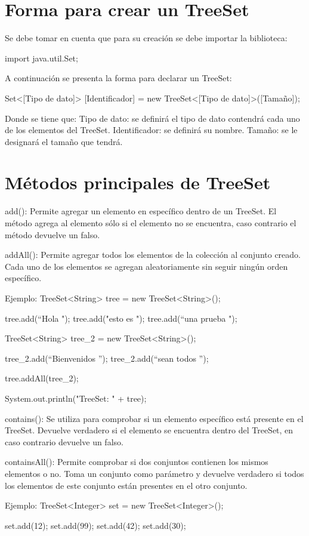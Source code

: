 \documentclass[12pt, letterpaper]{article} %
\begin{document}
\section*{Forma para crear un TreeSet}
Se debe tomar en cuenta que para su creación se debe importar la biblioteca:

import java.util.Set;

A continuación se presenta la forma para declarar un TreeSet:

Set<[Tipo de dato]> [Identificador] = new TreeSet<[Tipo de dato]>([Tamaño]);

Donde se tiene que:
Tipo de dato: se definirá el tipo de dato contendrá cada uno de los elementos del TreeSet.
Identificador: se definirá su nombre.
Tamaño: se le designará el tamaño que tendrá.

\section*{Métodos principales de TreeSet}
add():
Permite agregar un elemento en específico dentro de un TreeSet. El método agrega al elemento sólo si el elemento no se encuentra, caso contrario el método devuelve un falso.

addAll():
Permite agregar todos los elementos de la colección al conjunto creado. Cada uno de los elementos se agregan aleatoriamente sin seguir ningún orden específico.

Ejemplo:
TreeSet<String> tree = new TreeSet<String>();

tree.add(“Hola ");
tree.add("esto es ");
tree.add(“una prueba ");

TreeSet<String> tree_2 = new TreeSet<String>();

tree_2.add(“Bienvenidos ”);
tree_2.add(“sean todos ”);

tree.addAll(tree_2);

System.out.println("TreeSet: " + tree);


contains():
Se utiliza para comprobar si un elemento específico está presente en el TreeSet. Devuelve verdadero si el elemento se encuentra dentro del TreeSet, en caso contrario devuelve un falso.

containsAll():
Permite comprobar si dos conjuntos contienen los mismos elementos o no. Toma un conjunto como parámetro y devuelve verdadero si todos los elementos de este conjunto están presentes en el otro conjunto.

Ejemplo:
TreeSet<Integer> set = new TreeSet<Integer>();

set.add(12);
set.add(99);
set.add(42);
set.add(30);
\end{document}
